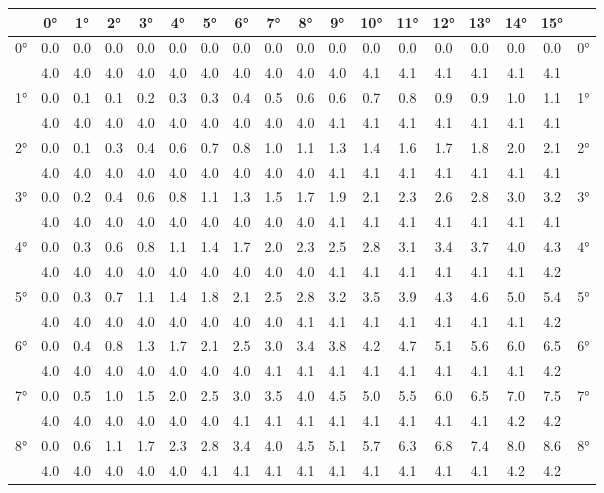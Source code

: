 \begin{scriptsize}\begin{tabular}{c || c | c | c | c | c | c | c | c | c | c | c | c | c | c | c | c || c}
		\space &0°&1°&2°&3°&4°&5°&6°&7°&8°&9°&10°&11°&12°&13°&14°&15°\\\hline\hline
		\multirow{2}{*}{0°}&0.0&0.0&0.0&0.0&0.0&0.0&0.0&0.0&0.0&0.0&0.0&0.0&0.0&0.0&0.0&0.0&\multirow{2}{*}{0°}\\ \space&4.0&4.0&4.0&4.0&4.0&4.0&4.0&4.0&4.0&4.0&4.1&4.1&4.1&4.1&4.1&4.1&\space\\\hline
		\multirow{2}{*}{1°}&0.0&0.1&0.1&0.2&0.3&0.3&0.4&0.5&0.6&0.6&0.7&0.8&0.9&0.9&1.0&1.1&\multirow{2}{*}{1°}\\ \space&4.0&4.0&4.0&4.0&4.0&4.0&4.0&4.0&4.0&4.1&4.1&4.1&4.1&4.1&4.1&4.1&\space\\\hline
		\multirow{2}{*}{2°}&0.0&0.1&0.3&0.4&0.6&0.7&0.8&1.0&1.1&1.3&1.4&1.6&1.7&1.8&2.0&2.1&\multirow{2}{*}{2°}\\ \space&4.0&4.0&4.0&4.0&4.0&4.0&4.0&4.0&4.0&4.1&4.1&4.1&4.1&4.1&4.1&4.1&\space\\\hline
		\multirow{2}{*}{3°}&0.0&0.2&0.4&0.6&0.8&1.1&1.3&1.5&1.7&1.9&2.1&2.3&2.6&2.8&3.0&3.2&\multirow{2}{*}{3°}\\ \space&4.0&4.0&4.0&4.0&4.0&4.0&4.0&4.0&4.0&4.1&4.1&4.1&4.1&4.1&4.1&4.1&\space\\\hline
		\multirow{2}{*}{4°}&0.0&0.3&0.6&0.8&1.1&1.4&1.7&2.0&2.3&2.5&2.8&3.1&3.4&3.7&4.0&4.3&\multirow{2}{*}{4°}\\ \space&4.0&4.0&4.0&4.0&4.0&4.0&4.0&4.0&4.0&4.1&4.1&4.1&4.1&4.1&4.1&4.2&\space\\\hline
		\multirow{2}{*}{5°}&0.0&0.3&0.7&1.1&1.4&1.8&2.1&2.5&2.8&3.2&3.5&3.9&4.3&4.6&5.0&5.4&\multirow{2}{*}{5°}\\ \space&4.0&4.0&4.0&4.0&4.0&4.0&4.0&4.0&4.1&4.1&4.1&4.1&4.1&4.1&4.1&4.2&\space\\\hline
		\multirow{2}{*}{6°}&0.0&0.4&0.8&1.3&1.7&2.1&2.5&3.0&3.4&3.8&4.2&4.7&5.1&5.6&6.0&6.5&\multirow{2}{*}{6°}\\ \space&4.0&4.0&4.0&4.0&4.0&4.0&4.0&4.1&4.1&4.1&4.1&4.1&4.1&4.1&4.1&4.2&\space\\\hline
		\multirow{2}{*}{7°}&0.0&0.5&1.0&1.5&2.0&2.5&3.0&3.5&4.0&4.5&5.0&5.5&6.0&6.5&7.0&7.5&\multirow{2}{*}{7°}\\ \space&4.0&4.0&4.0&4.0&4.0&4.0&4.1&4.1&4.1&4.1&4.1&4.1&4.1&4.1&4.2&4.2&\space\\\hline
		\multirow{2}{*}{8°}&0.0&0.6&1.1&1.7&2.3&2.8&3.4&4.0&4.5&5.1&5.7&6.3&6.8&7.4&8.0&8.6&\multirow{2}{*}{8°}\\ \space&4.0&4.0&4.0&4.0&4.0&4.1&4.1&4.1&4.1&4.1&4.1&4.1&4.1&4.1&4.2&4.2&\space\\\hline

\end{tabular}
\end{scriptsize}
